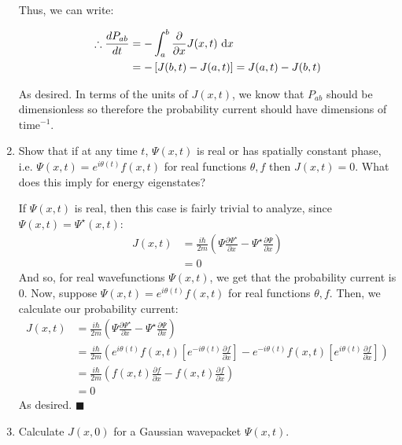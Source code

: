 \documentclass{article}
\begin{document}
\begin{enumerate}[label=(\alph*)]
\begin{solution}
        Thus, we can write:

        \begin{align*}
          \therefore \frac{dP_{ab}}{dt} &= -\int_{a}^{b}\frac{\partial}{\partial x}J(x,t) \ \mathrm d x \\
          &=  -\left[J(b,t) - J(a,t)\right] = J(a,t) - J(b,t)
        \end{align*}

        As desired. In terms of the units of $J(x, t)$, we know that $P_{ab}$ should be dimensionless so therefore the probability current should have dimensions of $\text{time}^{-1}$.
    \end{solution}

    \item Show that if at any time $t$, $\Psi(x, t)$ is real or has spatially constant phase, i.e. $\Psi(x, t) = e^{i\theta(t)}f(x, t)$ for real functions $\theta, f$ then $J(x, t) = 0$. What does this imply for energy eigenstates?
    

    \begin{solution}
        If $\Psi(x,t)$ is real, then this case is fairly trivial to analyze, since $\Psi(x, t) = \Psi^\star(x, t)$:
        \begin{align*}
          J(x,t) &= \frac{i\hbar}{2m}\left(\Psi\frac{\partial\Psi^\star}{\partial x} - \Psi^\star\frac{\partial\Psi}{\partial x}\right)\\
          &= 0
        \end{align*}
        And so, for real wavefunctions $\Psi(x,t)$, we get that the probability current is 0. Now, suppose $\Psi(x,t) = e^{i\theta(t)}f(x,t)$ for real functions $\theta,f$. Then, we calculate our probability current:
        \begin{align*}
          J(x,t) &= \frac{i\hbar}{2m}\left(\Psi\frac{\partial\Psi^\star}{\partial x} - \Psi^\star\frac{\partial \Psi}{\partial x}\right)\\
          &= \frac{i\hbar}{2m}\left(e^{i\theta(t)}f(x,t)\left[e^{-i\theta(t)}\frac{\partial f}{\partial x}\right] - e^{-i\theta(t)}f(x,t)\left[e^{i\theta(t)}\frac{\partial f}{\partial x}\right]\right)\\
          &= \frac{i\hbar}{2m}\left(f(x,t)\frac{\partial f}{\partial x} - f(x,t)\frac{\partial f}{\partial x}\right)\\
          &= 0
        \end{align*}
        As desired. $\blacksquare$
    \end{solution}
    \item Calculate $J(x, 0)$ for a Gaussian wavepacket $\Psi(x, t)$.
    

\end{enumerate}
\end{document}
